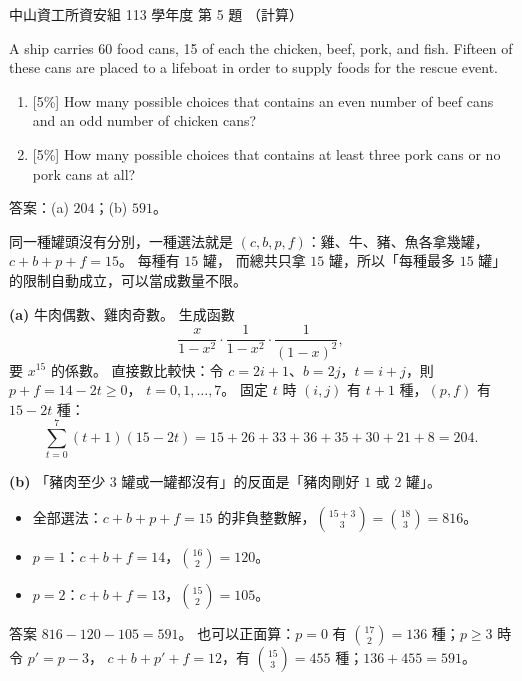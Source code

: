 \begin{pastexam}[label={px:nsysu-113-dmalg-05}]{中山資工所資安組 113 學年度 第 5 題}
（計算）

A ship carries 60 food cans, 15 of each the chicken, beef, pork, and fish. Fifteen of these cans are placed
to a lifeboat in order to supply foods for the rescue event.
\begin{enumerate}[label=(\alph*)]
\item {[5\%]} How many possible choices that contains an even number of beef cans and an odd number of
chicken cans?
\item {[5\%]} How many possible choices that contains at least three pork cans or no pork cans at all?
\end{enumerate}
\end{pastexam}

\begin{pastsoln}
答案：(a) $204$；(b) $591$。

同一種罐頭沒有分別，一種選法就是 $(c, b, p, f)$：雞、牛、豬、魚各拿幾罐，$c + b + p + f = 15$。 每種有 $15$ 罐，
而總共只拿 $15$ 罐，所以「每種最多 $15$ 罐」的限制自動成立，可以當成數量不限。

\textbf{(a)} 牛肉偶數、雞肉奇數。 生成函數
\[
\frac{x}{1 - x^2} \cdot \frac{1}{1 - x^2} \cdot \frac{1}{(1 - x)^2},
\]
要 $x^{15}$ 的係數。 直接數比較快：令 $c = 2i + 1$、$b = 2j$，$t = i + j$，則 $p + f = 14 - 2t \ge 0$，
$t = 0, 1, \ldots, 7$。 固定 $t$ 時 $(i, j)$ 有 $t + 1$ 種，$(p, f)$ 有 $15 - 2t$ 種：
\[
\sum_{t=0}^{7} (t + 1)(15 - 2t) = 15 + 26 + 33 + 36 + 35 + 30 + 21 + 8 = 204 .
\]

\textbf{(b)} 「豬肉至少 $3$ 罐或一罐都沒有」的反面是「豬肉剛好 $1$ 或 $2$ 罐」。
\begin{itemize}
\item 全部選法：$c + b + p + f = 15$ 的非負整數解，$\binom{15 + 3}{3} = \binom{18}{3} = 816$。
\item $p = 1$：$c + b + f = 14$，$\binom{16}{2} = 120$。
\item $p = 2$：$c + b + f = 13$，$\binom{15}{2} = 105$。
\end{itemize}
答案 $816 - 120 - 105 = 591$。 也可以正面算：$p = 0$ 有 $\binom{17}{2} = 136$ 種；$p \ge 3$ 時令 $p' = p - 3$，
$c + b + p' + f = 12$，有 $\binom{15}{3} = 455$ 種；$136 + 455 = 591$。
\end{pastsoln}
